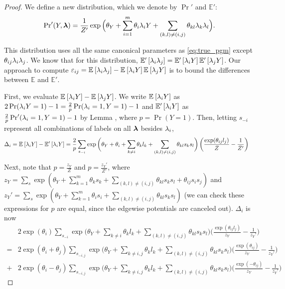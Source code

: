 \begin{proof}
We define a new distribution, which we denote by $\Pr'$ and $\mathbb{E}'$:
\begin{align}
    \mathrm{Pr}'(Y, \bm{\lambda}) = \frac{1}{Z'} \exp \Big(\theta_Y + \sum_{i = 1}^m \theta_i \lambda_i Y + \sum_{(k, l) \neq (i,j)} \theta_{kl} \lambda_k \lambda_l \Big).
    \label{eq:wrong_pgm}
\end{align}

This distribution uses all the same canonical parameters as \eqref{eq:true_pgm} except $\theta_{ij} \lambda_i \lambda_j$. We know that for this distribution, $\mathbb{E}'_{}\left[\lambda_i \lambda_j\right] = \mathbb{E}'_{}\left[\lambda_i Y\right] \mathbb{E}'_{}\left[\lambda_j Y\right]$. Our approach to compute $\varepsilon_{ij} = \mathbb{E}_{}\left[\lambda_i \lambda_j\right] - \mathbb{E}_{}\left[\lambda_i Y\right] \mathbb{E}_{}\left[\lambda_j Y\right]$ is to bound the differences between $\mathbb{E}$ and $\mathbb{E}'$. 

First, we evaluate $\mathbb{E}_{}\left[\lambda_i Y\right] - \mathbb{E}_{}\left[\lambda_j Y\right]$. We write $\mathbb{E}_{}\left[\lambda_i Y\right]$ as $2\Pr(\lambda_i Y = 1) - 1 = \frac{2}{p} \Pr(\lambda_i = 1, Y = 1) - 1$ and $\mathbb{E}'_{}\left[\lambda_i Y\right]$ as $\frac{2}{p} \Pr'(\lambda_i = 1, Y = 1) - 1$  by Lemma , where $p = \Pr(Y = 1).$ Then, letting $s_{-i}$ represent all combinations of labels on all $\bm{\lambda}$ besides $\lambda_i$,
\begin{align}
    \Delta_i &= \mathbb{E}_{}\left[\lambda_i Y\right] - \mathbb{E}'_{}\left[\lambda_i Y\right] = \frac{2}{p} \sum_{s_{-i}} \exp \bigg(\theta_Y + \theta_i + \sum_{k \neq i} \theta_k l_k + \sum_{(k, l) \neq (i, j)} \theta_{kl} s_k s_l \bigg) \left(\frac{\exp(\theta_{ij} l_j)}{Z} - \frac{1}{Z'} \right)
\end{align}

Next, note that $p = \frac{z_Y}{Z}$ and $p = \frac{z_Y'}{Z'}$, where $z_Y = \sum_{s} \exp(\theta_Y + \sum_{k = 1}^m \theta_k s_k + \sum_{(k, l) \neq (i, j)} \theta_{kl} s_k s_l + \theta_{ij} s_i s_j)$ and  $z_Y' = \sum_s \exp(\theta_Y + \sum_{k = 1}^m \theta_i s_i + \sum_{(k, l) \neq (i, j)} \theta_{kl} s_k s_l)$ (we can check these expressions for $p$ are equal, since the edgewise potentials are canceled out). $\Delta_i$ is now 
\begin{align}
     &2 \exp(\theta_i) \sum_{s_{-i}} \exp \bigg(\theta_Y + \sum_{k \neq i} \theta_k l_k + \sum_{(k, l) \neq (i, j)} \theta_{kl} s_k s_l\bigg) \bigg(\frac{\exp(\theta_{ij} l_j)}{z_Y} - \frac{1}{z_Y'} \bigg) \\
     = &2 \exp(\theta_i + \theta_j) \sum_{s_{-i, j}} \exp \bigg(\theta_Y + \sum_{k \neq i, j} \theta_k l_k + \sum_{(k, l) \neq (i, j)} \theta_{kl} s_k s_l\bigg) \bigg(\frac{\exp(\theta_{ij})}{z_Y} - \frac{1}{z_Y'} \bigg) \\
     + &2 \exp(\theta_i - \theta_j) \sum_{s_{-i, j}} \exp \bigg(\theta_Y + \sum_{k \neq i, j} \theta_k l_k + \sum_{(k, l) \neq (i, j)} \theta_{kl} s_k s_l\bigg) \bigg(\frac{\exp(-\theta_{ij})}{z_Y} - \frac{1}{z_Y'} \bigg)
\end{align}


\end{proof}
